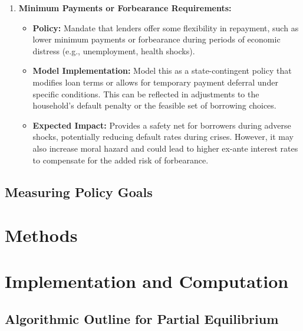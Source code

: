 \documentclass[acmsmall]{acmart}
\begin{document}
\begin{enumerate}
    \item \textbf{Minimum Payments or Forbearance Requirements:}
    \begin{itemize}
        \item \textbf{Policy:} Mandate that lenders offer some flexibility in repayment, such as lower minimum payments or forbearance during periods of economic distress (e.g., unemployment, health shocks).
        \item \textbf{Model Implementation:} Model this as a state-contingent policy that modifies loan terms or allows for temporary payment deferral under specific conditions. This can be reflected in adjustments to the household's default penalty or the feasible set of borrowing choices.
        \item \textbf{Expected Impact:} Provides a safety net for borrowers during adverse shocks, potentially reducing default rates during crises. However, it may also increase moral hazard and could lead to higher ex-ante interest rates to compensate for the added risk of forbearance.
    \end{itemize}
\end{enumerate}


\subsection{Measuring Policy Goals}

\section{Methods}

\section*{Implementation and Computation}

\subsection{Algorithmic Outline for Partial Equilibrium}
\end{document}
